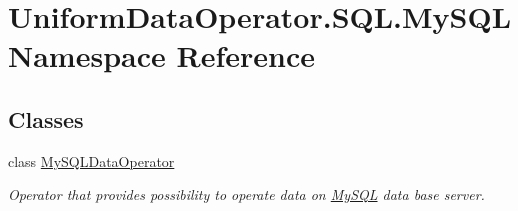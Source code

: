 \hypertarget{namespace_uniform_data_operator_1_1_s_q_l_1_1_my_s_q_l}{}\section{Uniform\+Data\+Operator.\+S\+Q\+L.\+My\+S\+QL Namespace Reference}
\label{namespace_uniform_data_operator_1_1_s_q_l_1_1_my_s_q_l}
\subsection*{Classes}
\begin{DoxyCompactItemize}
\item 
class \mbox{\hyperlink{class_uniform_data_operator_1_1_s_q_l_1_1_my_s_q_l_1_1_my_s_q_l_data_operator}{My\+S\+Q\+L\+Data\+Operator}}
\begin{DoxyCompactList}\small\item\em Operator that provides possibility to operate data on \mbox{\hyperlink{namespace_uniform_data_operator_1_1_s_q_l_1_1_my_s_q_l}{My\+S\+QL}} data base server. \end{DoxyCompactList}\end{DoxyCompactItemize}

